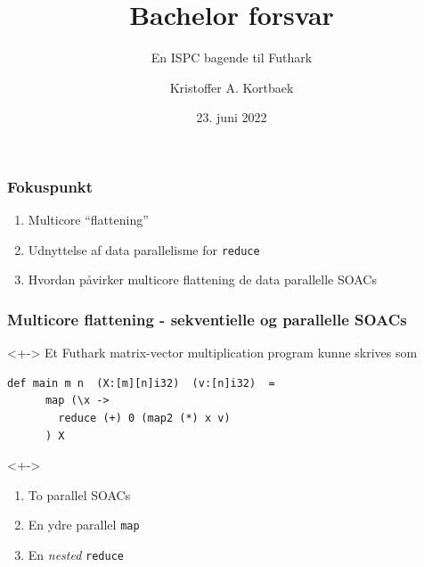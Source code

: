 \documentclass[t]{beamer}
\title{Bachelor forsvar}
\subtitle{En ISPC bagende til Futhark}
\author{Kristoffer A. Kortbaek}
\date{23. juni 2022}
\begin{document}
\begin{frame}
  \titlepage
\end{frame}

\begin{frame}[c]
  \frametitle{Fokuspunkt}

  \begin{enumerate}
    \item<+-> Multicore ``flattening''
    \item<+-> Udnyttelse af data parallelisme for \texttt{reduce}
    \item<+-> Hvordan påvirker multicore flattening de data parallelle SOACs
  \end{enumerate}
\end{frame}

\begin{frame}[fragile]
  \frametitle{Multicore flattening - sekventielle og parallelle SOACs}
  \begin{onlyenv}<+->
    Et Futhark matrix-vector multiplication program kunne skrives som
\begin{lstlisting}[language=futhark]
    def main m n  (X:[m][n]i32)  (v:[n]i32)  =
      map (\x ->
        reduce (+) 0 (map2 (*) x v)
      ) X
\end{lstlisting}
  \end{onlyenv}
  <+->
  \begin{enumerate}
    \item<+-> To parallel SOACs
    \item<+-> En ydre parallel \texttt{map}
    \item<+-> En \textit{nested} \texttt{reduce}
  \end{enumerate}


\end{frame}
\end{document}
